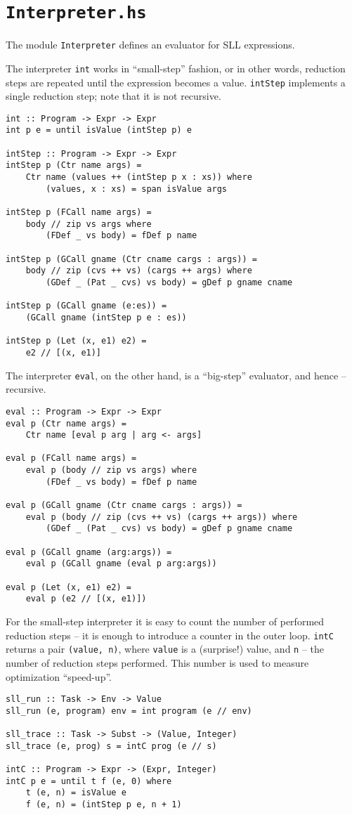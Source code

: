 \section{\texttt{Interpreter.hs}}
The module \texttt{Interpreter} defines an evaluator for SLL expressions.

The interpreter \texttt{int} works in ``small-step'' fashion, or in other words,
reduction steps are repeated until the expression becomes a value.
\texttt{intStep} implements a single reduction step; note that it is not recursive.
\begin{lstlisting}[name=interpreter]
int :: Program -> Expr -> Expr
int p e = until isValue (intStep p) e

intStep :: Program -> Expr -> Expr
intStep p (Ctr name args) =
	Ctr name (values ++ (intStep p x : xs)) where
		(values, x : xs) = span isValue args

intStep p (FCall name args) =
	body // zip vs args where
		(FDef _ vs body) = fDef p name

intStep p (GCall gname (Ctr cname cargs : args)) =
	body // zip (cvs ++ vs) (cargs ++ args) where
		(GDef _ (Pat _ cvs) vs body) = gDef p gname cname

intStep p (GCall gname (e:es)) =
	(GCall gname (intStep p e : es))

intStep p (Let (x, e1) e2) =
	e2 // [(x, e1)]
\end{lstlisting}

The interpreter \texttt{eval}, on the other hand, is a ``big-step'' evaluator,
and hence -- recursive.
\begin{lstlisting}[name=interpreter]
eval :: Program -> Expr -> Expr
eval p (Ctr name args) =
	Ctr name [eval p arg | arg <- args]

eval p (FCall name args) =
	eval p (body // zip vs args) where
		(FDef _ vs body) = fDef p name

eval p (GCall gname (Ctr cname cargs : args)) =
	eval p (body // zip (cvs ++ vs) (cargs ++ args)) where
		(GDef _ (Pat _ cvs) vs body) = gDef p gname cname

eval p (GCall gname (arg:args)) =
	eval p (GCall gname (eval p arg:args))

eval p (Let (x, e1) e2) =
	eval p (e2 // [(x, e1)])
\end{lstlisting}

For the small-step interpreter it is easy to count the number of performed reduction steps
-- it is enough to introduce a counter in the outer loop.
\texttt{intC} returns a pair \texttt{(value,~n)}, where \texttt{value} is a (surprise!) value,
and \texttt{n} -- the number of reduction steps performed.
This number is used to measure optimization ``speed-up''.
\begin{lstlisting}[name=interpreter]
sll_run :: Task -> Env -> Value
sll_run (e, program) env = int program (e // env)

sll_trace :: Task -> Subst -> (Value, Integer)
sll_trace (e, prog) s = intC prog (e // s)

intC :: Program -> Expr -> (Expr, Integer)
intC p e = until t f (e, 0) where
	t (e, n) = isValue e
	f (e, n) = (intStep p e, n + 1)
\end{lstlisting}

